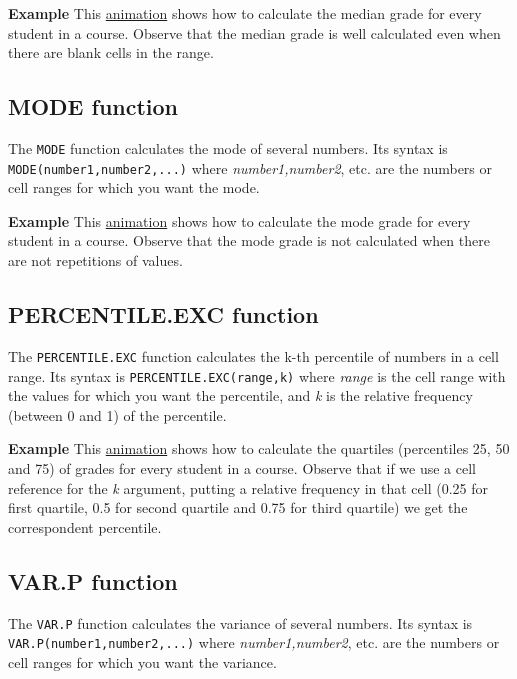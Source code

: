 \textbf{Example} This \href{http://aprendeconalf.es/office/excel/manual/img/example_function_median.gif}{animation} shows how to calculate the median grade for every student in a course. Observe that the median grade is well calculated even when there are blank cells in the range.

\subsection{MODE function}\hypertarget{mode-function}{}\label{mode-function}

The \texttt{MODE} function calculates the mode of several numbers. Its syntax is \texttt{MODE(number1,number2,...)} where \emph{number1,number2}, etc. are the numbers or cell ranges for which you want the mode.

\textbf{Example} This \href{http://aprendeconalf.es/office/excel/manual/img/example_function_mode.gif}{animation} shows how to calculate the mode grade for every student in a course. Observe that the mode grade is not calculated when there are not repetitions of values.

\subsection{PERCENTILE.EXC function}\hypertarget{percentileexc-function}{}\label{percentileexc-function}

The \texttt{PERCENTILE.EXC} function calculates the k-th percentile of numbers in a cell range. Its syntax is \texttt{PERCENTILE.EXC(range,k)} where \emph{range} is the cell range with the values for which you want the percentile, and \emph{k} is the relative frequency (between 0 and 1) of the percentile.

\textbf{Example} This \href{http://aprendeconalf.es/office/excel/manual/img/example_function_percentile.gif}{animation} shows how to calculate the quartiles (percentiles 25, 50 and 75) of grades for every student in a course. Observe that if we use a cell reference for the \emph{k} argument, putting a relative frequency in that cell (0.25 for first quartile, 0.5 for second quartile and 0.75 for third quartile) we get the correspondent percentile.

\subsection{VAR.P function}\hypertarget{varp-function}{}\label{varp-function}

The \texttt{VAR.P} function calculates the variance of several numbers. Its syntax is \texttt{VAR.P(number1,number2,...)} where \emph{number1,number2}, etc. are the numbers or cell ranges for which you want the variance.

